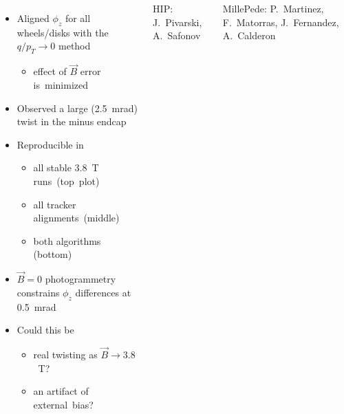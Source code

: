 \documentclass[compress]{beamer}
\begin{document}
\begin{frame}
\begin{columns}
\begin{itemize}
\item Aligned $\phi_z$ for all wheels/disks with
  the $q/p_T \to 0$ method

\vspace{-0.25 cm}
\begin{itemize}
\item effect of $\vec{B}$ error \mbox{is minimized\hspace{-1 cm}}
\end{itemize}

\item Observed a large (2.5~mrad) twist in the minus endcap 

\item Reproducible in

\vspace{-0.25 cm}
\begin{itemize}
\item all stable 3.8~T \mbox{runs (top plot)\hspace{-1 cm}}

\item all tracker \mbox{alignments (middle)\hspace{-1 cm}}

\item both algorithms \mbox{(bottom)\hspace{-1 cm}}
\end{itemize}

\item $\vec{B}=0$ photogrammetry \mbox{constrains\hspace{-0.5 cm}} $\phi_z$ differences at 0.5~mrad

\item Could this be

\vspace{-0.25 cm}
\begin{itemize}
\item real twisting as \mbox{$\vec{B} \to 3.8$~T?\hspace{-1 cm}}
\item an artifact of \mbox{external bias?\hspace{-0.5 cm}}
\end{itemize}

\end{itemize}

\vspace{0.25 cm}
\begin{columns}
\tiny HIP: J.\ Pivarski, A.\ Safonov

MillePede: P.\ Martinez, F.\ Matorras, J.\ Fernandez, A.\ Calderon
\end{columns}
\end{columns}
\end{frame}
\end{document}
